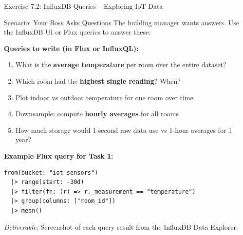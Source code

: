 \documentclass[aspectratio=169,11pt]{beamer}
\begin{document}
\begin{frame}[fragile]{Exercise 7.2: InfluxDB Queries -- Exploring IoT Data}
    \begin{block}{Scenario: Your Boss Asks Questions}
        The building manager wants answers. Use the InfluxDB UI or Flux queries to answer these:
    \end{block}

    \vspace{0.2cm}
    \textbf{Queries to write (in Flux or InfluxQL):}
    \begin{enumerate}
        \item What is the \textbf{average temperature} per room over the entire dataset?
        \item Which room had the \textbf{highest single reading}? When?
        \item Plot indoor vs outdoor temperature for one room over time
        \item Downsample: compute \textbf{hourly averages} for all rooms
        \item How much storage would 1-second raw data use vs 1-hour averages for 1 year?
    \end{enumerate}

    \vspace{0.1cm}
    \textbf{Example Flux query for Task 1:}
\begin{lstlisting}
from(bucket: "iot-sensors")
  |> range(start: -30d)
  |> filter(fn: (r) => r._measurement == "temperature")
  |> group(columns: ["room_id"])
  |> mean()
\end{lstlisting}

    {\footnotesize \textit{Deliverable:} Screenshot of each query result from the InfluxDB Data Explorer.}
\end{frame}
\end{document}
